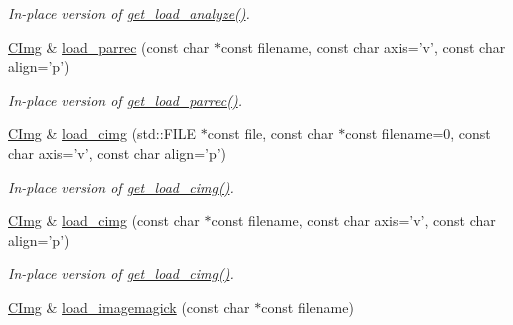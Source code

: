 \begin{DoxyCompactItemize}
\begin{DoxyCompactList}\small\item\em In-\/place version of \hyperlink{structcimg__library_1_1_c_img_ae9cf619d3ff9e70dfa352216dc67f388}{get\_\-load\_\-analyze()}. \item\end{DoxyCompactList}\item 
\hypertarget{structcimg__library_1_1_c_img_ac1d1998eb076fee2367bda54fe250234}{
\hyperlink{structcimg__library_1_1_c_img}{CImg} \& \hyperlink{structcimg__library_1_1_c_img_ac1d1998eb076fee2367bda54fe250234}{load\_\-parrec} (const char $\ast$const filename, const char axis='v', const char align='p')}
\label{structcimg__library_1_1_c_img_ac1d1998eb076fee2367bda54fe250234}

\begin{DoxyCompactList}\small\item\em In-\/place version of \hyperlink{structcimg__library_1_1_c_img_ab8fa719a8dba627519d3e899536b7b95}{get\_\-load\_\-parrec()}. \item\end{DoxyCompactList}\item 
\hypertarget{structcimg__library_1_1_c_img_a4d1e8205414d76ca815a11275df6facb}{
\hyperlink{structcimg__library_1_1_c_img}{CImg} \& \hyperlink{structcimg__library_1_1_c_img_a4d1e8205414d76ca815a11275df6facb}{load\_\-cimg} (std::FILE $\ast$const file, const char $\ast$const filename=0, const char axis='v', const char align='p')}
\label{structcimg__library_1_1_c_img_a4d1e8205414d76ca815a11275df6facb}

\begin{DoxyCompactList}\small\item\em In-\/place version of \hyperlink{structcimg__library_1_1_c_img_a96932bb71719972c24e77ca79b2c1d3a}{get\_\-load\_\-cimg()}. \item\end{DoxyCompactList}\item 
\hypertarget{structcimg__library_1_1_c_img_a4390296db3af4f3a30a631dd753129d2}{
\hyperlink{structcimg__library_1_1_c_img}{CImg} \& \hyperlink{structcimg__library_1_1_c_img_a4390296db3af4f3a30a631dd753129d2}{load\_\-cimg} (const char $\ast$const filename, const char axis='v', const char align='p')}
\label{structcimg__library_1_1_c_img_a4390296db3af4f3a30a631dd753129d2}

\begin{DoxyCompactList}\small\item\em In-\/place version of \hyperlink{structcimg__library_1_1_c_img_a96932bb71719972c24e77ca79b2c1d3a}{get\_\-load\_\-cimg()}. \item\end{DoxyCompactList}\item 
\hypertarget{structcimg__library_1_1_c_img_a3fcf726ab135a8f5fba0cbb0acaaa625}{
\hyperlink{structcimg__library_1_1_c_img}{CImg} \& \hyperlink{structcimg__library_1_1_c_img_a3fcf726ab135a8f5fba0cbb0acaaa625}{load\_\-imagemagick} (const char $\ast$const filename)}
\label{structcimg__library_1_1_c_img_a3fcf726ab135a8f5fba0cbb0acaaa625}


\end{DoxyCompactItemize}
